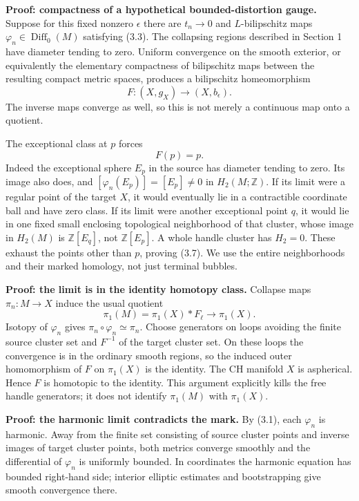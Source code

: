 \documentclass[
  11pt,
]{article}
\begin{document}
\textbf{Proof: compactness of a hypothetical bounded-distortion gauge.}
Suppose for this fixed nonzero \(\epsilon\) there are \(t_n\to0\) and
\(L\)-bilipschitz maps \(\varphi_n\in\operatorname{Diff}_0(M)\)
satisfying (3.3). The collapsing regions described in Section 1 have
diameter tending to zero. Uniform convergence on the smooth exterior, or
equivalently the elementary compactness of bilipschitz maps between the
resulting compact metric spaces, produces a bilipschitz homeomorphism \[
 F:(X,g_X)\longrightarrow(X,b_\epsilon).                     \tag{3.6}
\] The inverse maps converge as well, so this is not merely a continuous
map onto a quotient.

The exceptional class at \(p\) forces \[
 F(p)=p.                                                     \tag{3.7}
\] Indeed the exceptional sphere \(E_p\) in the source has diameter
tending to zero. Its image also does, and \([\varphi_n(E_p)]=[E_p]\ne0\)
in \(H_2(M;\mathbb Z)\). If its limit were a regular point of the target
\(X\), it would eventually lie in a contractible coordinate ball and
have zero class. If its limit were another exceptional point \(q\), it
would lie in one fixed small enclosing topological neighborhood of that
cluster, whose image in \(H_2(M)\) is \(\mathbb Z[E_q]\), not
\(\mathbb Z[E_p]\). A whole handle cluster has \(H_2=0\). These exhaust
the points other than \(p\), proving (3.7). We use the entire
neighborhoods and their marked homology, not just terminal bubbles.

\textbf{Proof: the limit is in the identity homotopy class.} Collapse
maps \(\pi_n:M\to X\) induce the usual quotient \[
 \pi_1(M)=\pi_1(X)*F_\ell\longrightarrow\pi_1(X).
\] Isotopy of \(\varphi_n\) gives \(\pi_n\circ\varphi_n\simeq\pi_n\).
Choose generators on loops avoiding the finite source cluster set and
\(F^{-1}\) of the target cluster set. On these loops the convergence is
in the ordinary smooth regions, so the induced outer homomorphism of
\(F\) on \(\pi_1(X)\) is the identity. The CH manifold \(X\) is
aspherical. Hence \(F\) is homotopic to the identity. This argument
explicitly kills the free handle generators; it does not identify
\(\pi_1(M)\) with \(\pi_1(X)\).

\textbf{Proof: the harmonic limit contradicts the mark.} By (3.1), each
\(\varphi_n\) is harmonic. Away from the finite set consisting of source
cluster points and inverse images of target cluster points, both metrics
converge smoothly and the differential of \(\varphi_n\) is uniformly
bounded. In coordinates the harmonic equation has bounded right-hand
side; interior elliptic estimates and bootstrapping give smooth
convergence there.
\end{document}
